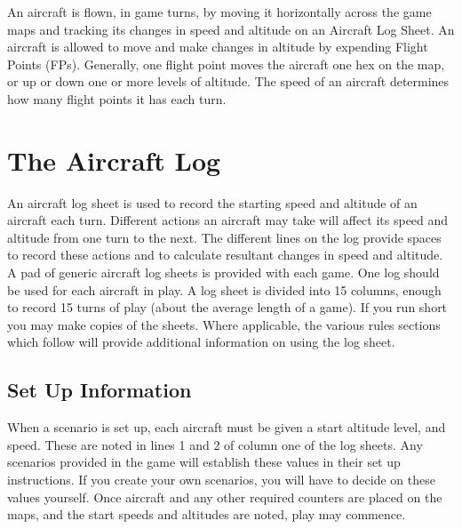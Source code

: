 


An aircraft is flown, in game turns, by moving it horizontally across the game maps and tracking its changes in speed and altitude on an Aircraft Log Sheet. An aircraft is allowed to move and make changes in altitude by expending Flight Points (FPs). Generally, one flight point moves the aircraft one hex on the map, or up or down one or more levels of altitude. The speed of an aircraft determines how many flight points it has each turn.

\section{The Aircraft Log}
\label{rule:aircraft-log-sheets}

An aircraft log sheet is used to record the starting speed and altitude of an aircraft each turn. Different actions an aircraft may take will affect its speed and altitude from one turn to the next. The different lines on the log provide spaces to record these actions and to calculate resultant changes in speed and altitude. A pad of generic aircraft log sheets is provided with each game. One log should be used for each aircraft in play. A log sheet is divided into 15 columns, enough to record 15 turns of play (about the average length of a game). If you run short you may make copies of the sheets. Where applicable, the various rules sections which follow will provide additional information on using the log sheet.

\subsection{Set Up Information}
When a scenario is set up, each aircraft must be given a start altitude level, and speed. These are noted in lines 1 and 2 of column one of the log sheets. Any scenarios provided in the game will establish these values in their set up instructions. If you create your own scenarios, you will have to decide on these values yourself. Once aircraft and any other required counters are placed on the maps, and the start speeds and altitudes are noted, play may commence.

